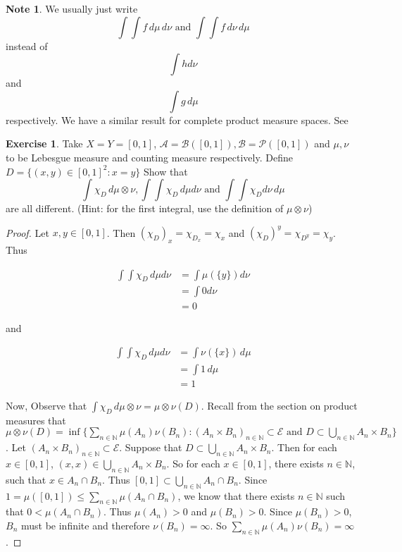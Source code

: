 \documentclass{book}
\theoremstyle{definition}
\newtheorem{note}[definition]{Note}
\newtheorem{ex}[definition]{Exercise}
\newcommand{\N}{\mathbb{N}}
\newcommand{\MA}{\mathcal{A}}
\newcommand{\MB}{\mathcal{B}}
\newcommand{\ME}{\mathcal{E}}
\newcommand{\MP}{\mathcal{P}}
\newcommand{\lex}[1]{\label{ex:#1}}
\DeclareMathOperator*{\0}{\mbf{0}}
\DeclareMathOperator*{\1}{\mbf{1}}
\newcommand{\dmu}{\, d \mu}
\newcommand{\dnu}{\, d \nu}
\begin{document}
	\begin{note}
		We usually just write $$\int \int f \dmu \dnu \text{ and } \int \int f \dnu \dmu$$ instead of $$\int h d\nu$$ and $$\int g \dmu $$ respectively. We have a similar result for complete product measure spaces. See 
	\end{note}
	
	\begin{ex} \lex{00000} 
		Take $X=Y= [0,1]$, $\MA = \MB([0,1]), \MB = \MP([0,1])$ and $\mu,\nu$ to be Lebesgue measure and counting measure respectively. Define $D = \{(x,y) \in [0,1]^2: x=y\}$ Show that $$\int \chi_D \dmu \otimes \nu, \int \int \chi_D \dmu d \nu \text{ and } \int \int \chi_D d\nu \dmu$$ are all different. (Hint: for the first integral, use the definition of $\mu \otimes \nu$)
	\end{ex}
	
	\begin{proof}
		Let $x,y \in [0,1]$. Then $(\chi_D)_x = \chi_{D_x} = \chi_{x}$ and $(\chi_D)^y = \chi_{D^y} = \chi_{y}$. Thus
		
		\begin{align*}
			\int \int \chi_D \dmu d \nu
			&= \int \mu(\{y\}) d\nu\\
			&= \int 0 d\nu\\
			&= 0
		\end{align*}
		
		and
		
		\begin{align*}
			\int \int \chi_D \dmu d \nu
			&= \int \nu(\{x\}) \dmu\\
			&= \int 1 \dmu\\
			&= 1
		\end{align*}
		
		Now, Observe that $\int \chi_D \dmu \otimes \nu = \mu \otimes \nu(D)$. Recall from the section on product measures that $\mu \otimes \nu(D) = \inf \{\sum_{n \in \N}\mu(A_n)\nu(B_n): (A_n \times B_n)_{n \in \N} \subset \ME \text{ and } D \subset \bigcup_{n \in \N} A_n \times B_n \}$. Let $(A_n \times B_n)_{n \in \N} \subset \ME$. Suppose that $D \subset \bigcup_{n \in \N}A_n \times B_n$. Then for each $x \in [0,1]$, $(x,x) \in  \bigcup_{n \in \N} A_n \times B_n$. So for each $x \in [0,1]$, there exists $n \in \N$, such that $x \in A_n \cap B_n$. Thus $[0,1] \subset \bigcup_{n \in \N} A_n \cap B_n.$ Since $1  = \mu([0,1]) \leq \sum_{n \in \N}\mu(A_n \cap B_n)$, we know that there exists $n \in \N$ such that $0 < \mu(A_n \cap B_n)$. Thus $\mu(A_n)> 0$ and $\mu(B_n) > 0$. Since $\mu(B_n) > 0$, $B_n$ must be infinite and therefore $\nu(B_n) = \infty$. So $\sum_{n \in \N} \mu(A_n)\nu(B_n) = \infty$.
		
	\end{proof}
	
\end{document}
